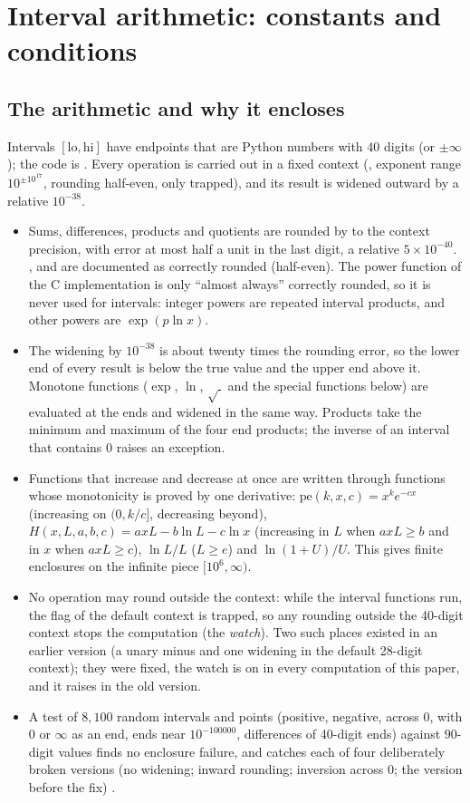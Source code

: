 \section{Interval arithmetic: constants and conditions}
\label{app:C}

\subsection{The arithmetic and why it encloses}

Intervals $[\mathrm{lo},\mathrm{hi}]$ have endpoints that are Python  numbers with $40$ digits (or $\pm\infty$); the code is .
Every operation is carried out in a fixed context (, exponent range $10^{\pm10^{17}}$, rounding half-even, only  trapped), and its result is widened outward by a relative $10^{-38}$.
\begin{itemize}
\item Sums, differences, products and quotients are rounded by  to the context precision, with error at most half a unit in the last digit, a relative $5\times10^{-40}$. ,  and  are documented as correctly rounded (half-even). The power function of the C implementation is only ``almost always'' correctly rounded, so it is never used for intervals: integer powers are repeated interval products, and other powers are $\exp(p\ln x)$.
\item The widening by $10^{-38}$ is about twenty times the rounding error, so the lower end of every result is below the true value and the upper end above it. Monotone functions ($\exp$, $\ln$, $\sqrt{\ }$ and the special functions below) are evaluated at the ends and widened in the same way. Products take the minimum and maximum of the four end products; the inverse of an interval that contains $0$ raises an exception.
\item Functions that increase and decrease at once are written through functions whose monotonicity is proved by one derivative: $\mathrm{pe}(k,x,c)=x^ke^{-cx}$ (increasing on $(0,k/c]$, decreasing beyond), $H(x,L,a,b,c)=axL-b\ln L-c\ln x$ (increasing in $L$ when $axL\ge b$ and in $x$ when $axL\ge c$), $\ln L/L$ ($L\ge e$) and $\ln(1+U)/U$. This gives finite enclosures on the infinite piece $[10^6,\infty)$.
\item No operation may round outside the context: while the interval functions run, the  flag of the default context is trapped, so any rounding outside the 40-digit context stops the computation (the \emph{watch}). Two such places existed in an earlier version (a unary minus and one widening in the default 28-digit context); they were fixed, the watch is on in every computation of this paper, and it raises in the old version.
\item A test of $8{,}100$ random intervals and points (positive, negative, across $0$, with $0$ or $\infty$ as an end, ends near $10^{-100000}$, differences of 40-digit ends) against $90$-digit values finds no enclosure failure, and catches each of four deliberately broken versions (no widening; inward rounding; inversion across $0$; the version before the fix) \numst.
\end{itemize}


